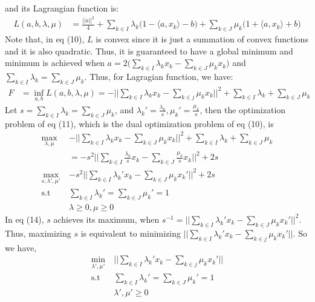 \documentclass[11pt, a4paper]{article}
\begin{document}
and its Lagrangian function is:
\begin{align}
L(a,b,\lambda,\mu) &= \frac{||a||^2}{4} + \sum_{k\in I} \lambda_k\big(1 - \langle a, x_k  \rangle - b\big) +\sum_{k\in J} \mu_k\big(1 + \langle a, x_k  \rangle + b\big)
\end{align}
Note that, in eq (10), $L$ is convex since it is just a summation of convex functions and it is also quadratic. Thus, it is guaranteed to have a global minimum and minimum is achieved when $a = 2\big(\sum_{k\in I}\lambda_k x_k - \sum_{k\in J}\mu_k x_k \big)$ and $\sum_{k\in I}\lambda_k = \sum_{k\in J}\mu_k$. Thus, for Lagragian function, we have:\begin{align}
F &= \inf_{a,b} L(a,b,\lambda,\mu) = -\bigg\lvert\bigg\lvert\sum_{k\in I}\lambda_k x_k - \sum_{k\in j}\mu_k x_k \bigg\rvert\bigg\rvert^2 + \sum_{k\in I}\lambda_k + \sum_{k\in J}\mu_k
\end{align}
Let $s = \sum_{k \in I} \lambda_k = \sum_{k \in J} \mu_k$, and $\lambda_k' = \frac{\lambda_k}{s}, \mu_k' = \frac{\mu_k}{s}$, then the optimization problem of eq (11), which is the dual optimization problem of eq (10), is
\begin{align}
\max_{\lambda, \mu}\ &-\bigg\lvert\bigg\lvert\sum_{k\in I}\lambda_k x_k - \sum_{k\in J}\mu_k x_k \bigg\rvert\bigg\rvert^2 + \sum_{k\in I}\lambda_k + \sum_{k\in J}\mu_k\\
&= -s^2\bigg\lvert\bigg\lvert \sum_{k\in I}\frac{\lambda_k}{s} x_k - \sum_{k\in J}\frac{\mu_k}{s} x_k \bigg\rvert\bigg\rvert^2 + 2s\\
\max_{s,\lambda', \mu'}\ &-s^2\bigg\lvert\bigg\lvert\sum_{k\in I}\lambda_k' x_k - \sum_{k\in J}\mu_k x_k' \bigg\rvert\bigg\rvert^2 + 2s\\
\text{s.t}\ &\sum_{k \in I}\lambda_k' = \sum_{k \in J}\mu_k' = 1\\
&\lambda \ge 0, \mu \ge 0
\end{align}
In eq (14), $s$ achieves its maximum, when $s^{-1} = \Big\lvert\Big\lvert\sum_{k\in I}\lambda_k' x_k - \sum_{k\in J}\mu_k x_k' \Big\rvert\Big\rvert^2$. Thus, maximizing $s$ is equivalent to minimizing $\Big\lvert\Big\lvert\sum_{k\in I}\lambda_k' x_k - \sum_{k\in j}\mu_k x_k' \Big\rvert\Big\rvert$. So we have,\begin{align}
\min_{\lambda',\mu'}\ &\Big\lvert\Big\lvert\sum_{k\in I}\lambda_k' x_k - \sum_{k\in j}\mu_k x_k' \Big\rvert\Big\rvert\\
\text{s.t}\ &\sum_{k\in I} \lambda_k' = \sum_{k\in J} \mu_k' = 1\\
&\lambda', \mu'\ge 0
\end{align}
\end{document}
